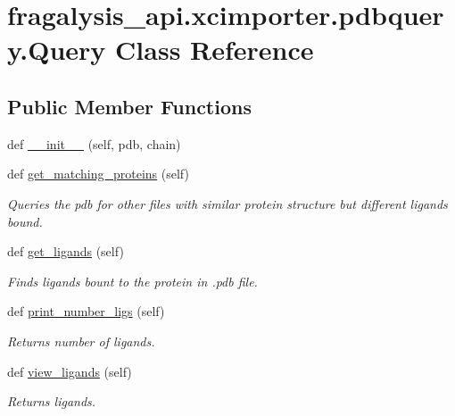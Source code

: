 \hypertarget{classfragalysis__api_1_1xcimporter_1_1pdbquery_1_1_query}{}\section{fragalysis\+\_\+api.\+xcimporter.\+pdbquery.\+Query Class Reference}
\label{classfragalysis__api_1_1xcimporter_1_1pdbquery_1_1_query}
\subsection*{Public Member Functions}
\begin{DoxyCompactItemize}
\item 
def \hyperlink{classfragalysis__api_1_1xcimporter_1_1pdbquery_1_1_query_a4c9143433e01d6c355246e1ea4f86265}{\+\_\+\+\_\+init\+\_\+\+\_\+} (self, pdb, chain)
\item 
def \hyperlink{classfragalysis__api_1_1xcimporter_1_1pdbquery_1_1_query_a0beef45de2126a3837b02050e1b90a74}{get\+\_\+matching\+\_\+proteins} (self)
\begin{DoxyCompactList}\small\item\em Queries the pdb for other files with similar protein structure but different ligands bound. \end{DoxyCompactList}\item 
def \hyperlink{classfragalysis__api_1_1xcimporter_1_1pdbquery_1_1_query_a846d2bc401e56a452222d95b630fb9b0}{get\+\_\+ligands} (self)
\begin{DoxyCompactList}\small\item\em Finds ligands bount to the protein in .pdb file. \end{DoxyCompactList}\item 
def \hyperlink{classfragalysis__api_1_1xcimporter_1_1pdbquery_1_1_query_a36dfa365ad219285d470107eba4e7080}{print\+\_\+number\+\_\+ligs} (self)
\begin{DoxyCompactList}\small\item\em Returns number of ligands. \end{DoxyCompactList}\item 
def \hyperlink{classfragalysis__api_1_1xcimporter_1_1pdbquery_1_1_query_ada4ce4d98d911a33baabe42bf38a4aa1}{view\+\_\+ligands} (self)
\begin{DoxyCompactList}\small\item\em Returns ligands. \end{DoxyCompactList}\item 

\end{DoxyCompactItemize}
